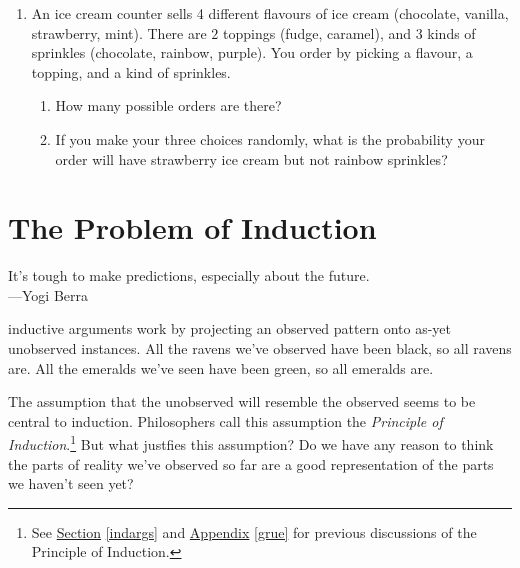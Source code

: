 \documentclass[justified]{tufte-book}
\providecommand{\tightlist}{%
  \setlength{\itemsep}{0pt}\setlength{\parskip}{0pt}}
\newenvironment{epigraph}%
{
\begin{flushright}    
\begin{minipage}{20em}
\begin{flushright}
\itshape
}%
{
\end{flushright}
\end{minipage}
\end{flushright}
}
\begin{document}
\begin{enumerate}
  Hint: draw a probability tree and ask yourself, ``if I did this experiment over and over again, how often would I draw a black marble in the long run?''

  \begin{enumerate}
  \def\labelenumii{\alph{enumii}.}
  \tightlist
  \item
    5/8
  \item
    3/8
  \item
    1/2
  \item
    1/4
  \end{enumerate}
\item
  An ice cream counter sells 4 different flavours of ice cream (chocolate, vanilla, strawberry, mint). There are \(2\) toppings (fudge, caramel), and \(3\) kinds of sprinkles (chocolate, rainbow, purple). You order by picking a flavour, a topping, and a kind of sprinkles.

  \begin{enumerate}
  \def\labelenumii{\alph{enumii}.}
  \tightlist
  \item
    How many possible orders are there?
  \item
    If you make your three choices randomly, what is the probability your order will have strawberry ice cream but not rainbow sprinkles?
  \end{enumerate}
\end{enumerate}

\hypertarget{the-problem-of-induction}{%
\chapter{The Problem of Induction}\label{the-problem-of-induction}}

\begin{epigraph}
It's tough to make predictions, especially about the future.\\
---Yogi Berra
\end{epigraph}

 inductive arguments work by projecting an observed pattern onto as-yet unobserved instances. All the ravens we've observed have been black, so all ravens are. All the emeralds we've seen have been green, so all emeralds are.

The assumption that the unobserved will resemble the observed seems to be central to induction. Philosophers call this assumption the \emph{Principle of Induction}.\footnote{See \protect\hyperlink{indargs}{Section} \ref{indargs} and \protect\hyperlink{grue}{Appendix} \ref{grue} for previous discussions of the Principle of Induction.} But what justfies this assumption? Do we have any reason to think the parts of reality we've observed so far are a good representation of the parts we haven't seen yet?
\end{document}
